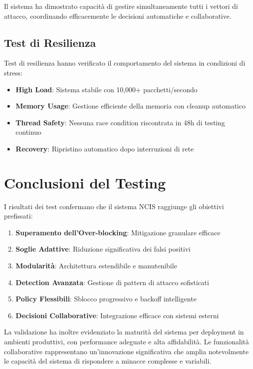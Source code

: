 Il sistema ha dimostrato capacità di gestire simultaneamente tutti i vettori di attacco, coordinando efficacemente le decisioni automatiche e collaborative.

\subsection{Test di Resilienza}
Test di resilienza hanno verificato il comportamento del sistema in condizioni di stress:
\begin{itemize}
    \item \textbf{High Load}: Sistema stabile con 10,000+ pacchetti/secondo
    \item \textbf{Memory Usage}: Gestione efficiente della memoria con cleanup automatico
    \item \textbf{Thread Safety}: Nessuna race condition riscontrata in 48h di testing continuo
    \item \textbf{Recovery}: Ripristino automatico dopo interruzioni di rete
\end{itemize}

\section{Conclusioni del Testing}

I risultati dei test confermano che il sistema NCIS raggiunge gli obiettivi prefissati:
\begin{enumerate}
    \item \textbf{Superamento dell'Over-blocking}: Mitigazione granulare efficace
    \item \textbf{Soglie Adattive}: Riduzione significativa dei falsi positivi
    \item \textbf{Modularità}: Architettura estendibile e manutenibile
    \item \textbf{Detection Avanzata}: Gestione di pattern di attacco sofisticati
    \item \textbf{Policy Flessibili}: Sblocco progressivo e backoff intelligente
    \item \textbf{Decisioni Collaborative}: Integrazione efficace con sistemi esterni
\end{enumerate}

La validazione ha inoltre evidenziato la maturità del sistema per deployment in ambienti produttivi, con performance adeguate e alta affidabilità. Le funzionalità collaborative rappresentano un'innovazione significativa che amplia notevolmente le capacità del sistema di rispondere a minacce complesse e variabili.

